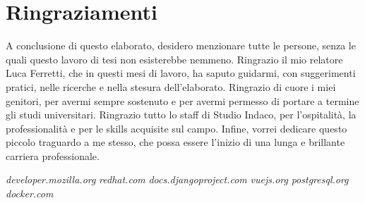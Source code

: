 \documentclass[12pt,a4paper]{article}
\begin{document}
\clearpage
\section*{Ringraziamenti}
A conclusione di questo elaborato, desidero menzionare tutte le persone, senza le quali questo lavoro di tesi non esisterebbe nemmeno.
Ringrazio il mio relatore Luca Ferretti, che in questi mesi di lavoro, ha saputo guidarmi, con suggerimenti pratici, nelle ricerche e nella stesura dell’elaborato.
Ringrazio di cuore i miei genitori, per avermi sempre sostenuto e per avermi permesso di portare a termine gli studi universitari.
Ringrazio tutto lo staff di Studio Indaco, per l’ospitalità, la professionalità e per le skills acquisite sul campo.
Infine, vorrei dedicare questo piccolo traguardo a me stesso, che possa essere l’inizio di una lunga e brillante carriera professionale.
\clearpage

\begin{thebibliography}{9}
        \bibitem{}
            \textit{developer.mozilla.org}
        \bibitem{}
            \textit{redhat.com}
        \bibitem{}
            \textit{docs.djangoproject.com}
        \bibitem{}
            \textit{vuejs.org}
        \bibitem{}
            \textit{postgresql.org}
        \bibitem{}
            \textit{docker.com}
    \end{thebibliography}
\end{document}
